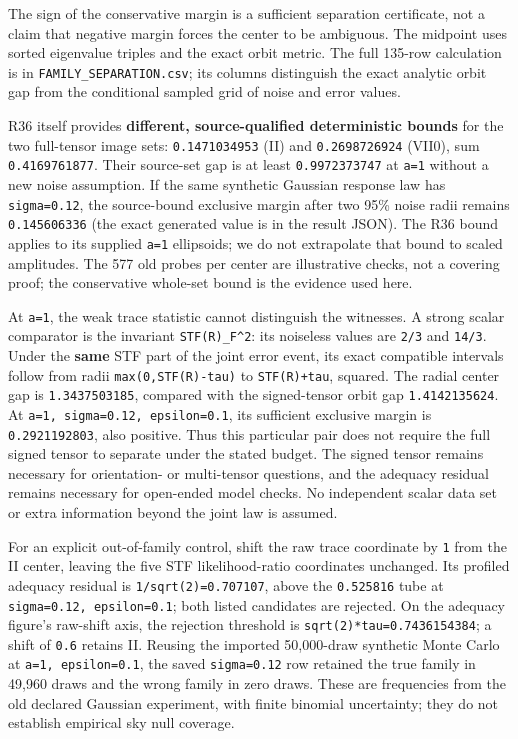 \documentclass[
]{article}
\begin{document}
The sign of the conservative margin is a sufficient separation
certificate, not a claim that negative margin forces the center to be
ambiguous. The midpoint uses sorted eigenvalue triples and the exact
orbit metric. The full 135-row calculation is in
\texttt{FAMILY\_SEPARATION.csv}; its columns distinguish the exact
analytic orbit gap from the conditional sampled grid of noise and error
values.

R36 itself provides \textbf{different, source-qualified deterministic
bounds} for the two full-tensor image sets: \texttt{0.1471034953} (II)
and \texttt{0.2698726924} (VII0), sum \texttt{0.4169761877}. Their
source-set gap is at least \texttt{0.9972373747} at \texttt{a=1} without
a new noise assumption. If the same synthetic Gaussian response law has
\texttt{sigma=0.12}, the source-bound exclusive margin after two 95\%
noise radii remains \texttt{0.145606336} (the exact generated value is
in the result JSON). The R36 bound applies to its supplied \texttt{a=1}
ellipsoids; we do not extrapolate that bound to scaled amplitudes. The
577 old probes per center are illustrative checks, not a covering proof;
the conservative whole-set bound is the evidence used here.

At \texttt{a=1}, the weak trace statistic cannot distinguish the
witnesses. A strong scalar comparator is the invariant
\texttt{\textbar{}\textbar{}STF(R)\textbar{}\textbar{}\_F\^{}2}: its
noiseless values are \texttt{2/3} and \texttt{14/3}. Under the
\textbf{same} STF part of the joint error event, its exact compatible
intervals follow from radii
\texttt{max(0,\textbar{}\textbar{}STF(R)\textbar{}\textbar{}-tau)} to
\texttt{\textbar{}\textbar{}STF(R)\textbar{}\textbar{}+tau}, squared.
The radial center gap is \texttt{1.3437503185}, compared with the
signed-tensor orbit gap \texttt{1.4142135624}. At
\texttt{a=1,\ sigma=0.12,\ epsilon=0.1}, its sufficient exclusive margin
is \texttt{0.2921192803}, also positive. Thus this particular pair does
not require the full signed tensor to separate under the stated budget.
The signed tensor remains necessary for orientation- or multi-tensor
questions, and the adequacy residual remains necessary for open-ended
model checks. No independent scalar data set or extra information beyond
the joint law is assumed.

For an explicit out-of-family control, shift the raw trace coordinate by
\texttt{1} from the II center, leaving the five STF likelihood-ratio
coordinates unchanged. Its profiled adequacy residual is
\texttt{1/sqrt(2)=0.707107}, above the \texttt{0.525816} tube at
\texttt{sigma=0.12,\ epsilon=0.1}; both listed candidates are rejected.
On the adequacy figure's raw-shift axis, the rejection threshold is
\texttt{sqrt(2)*tau=0.7436154384}; a shift of \texttt{0.6} retains II.
Reusing the imported 50,000-draw synthetic Monte Carlo at
\texttt{a=1,\ epsilon=0.1}, the saved \texttt{sigma=0.12} row retained
the true family in 49,960 draws and the wrong family in zero draws.
These are frequencies from the old declared Gaussian experiment, with
finite binomial uncertainty; they do not establish empirical sky null
coverage.
\end{document}
